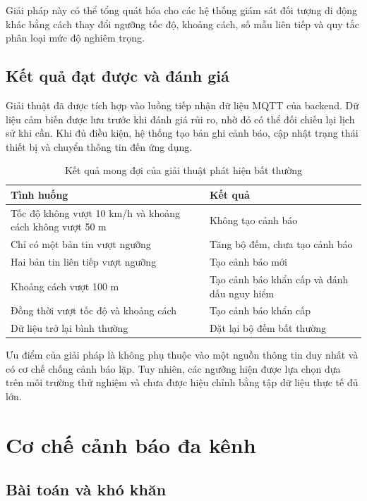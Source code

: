 \documentclass[../DoAn.tex]{subfiles}
\begin{document}
Giải pháp này có thể tổng quát hóa cho các hệ thống giám sát đối tượng di động
khác bằng cách thay đổi ngưỡng tốc độ, khoảng cách, số mẫu liên tiếp và quy tắc
phân loại mức độ nghiêm trọng.

\subsection{Kết quả đạt được và đánh giá}

Giải thuật đã được tích hợp vào luồng tiếp nhận dữ liệu MQTT của backend. Dữ
liệu cảm biến được lưu trước khi đánh giá rủi ro, nhờ đó có thể đối chiếu lại
lịch sử khi cần. Khi đủ điều kiện, hệ thống tạo bản ghi cảnh báo, cập nhật trạng
thái thiết bị và chuyển thông tin đến ứng dụng.

\begin{table}[ht]
\centering
\label{tab:ket-qua-phat-hien}
\begin{tabular}{|p{}|p{}|}
\hline
\textbf{Tình huống} & \textbf{Kết quả} \\ \hline
Tốc độ không vượt 10 km/h và khoảng cách không vượt 50 m & Không tạo cảnh báo \\ \hline
Chỉ có một bản tin vượt ngưỡng & Tăng bộ đếm, chưa tạo cảnh báo \\ \hline
Hai bản tin liên tiếp vượt ngưỡng & Tạo cảnh báo mới \\ \hline
Khoảng cách vượt 100 m & Tạo cảnh báo khẩn cấp và đánh dấu nguy hiểm \\ \hline
Đồng thời vượt tốc độ và khoảng cách & Tạo cảnh báo khẩn cấp \\ \hline
Dữ liệu trở lại bình thường & Đặt lại bộ đếm bất thường \\ \hline
\end{tabular}
\caption{Kết quả mong đợi của giải thuật phát hiện bất thường}
\end{table}

Ưu điểm của giải pháp là không phụ thuộc vào một nguồn thông tin duy nhất và có
cơ chế chống cảnh báo lặp. Tuy nhiên, các ngưỡng hiện được lựa chọn dựa trên môi
trường thử nghiệm và chưa được hiệu chỉnh bằng tập dữ liệu thực tế đủ lớn.


\section{Cơ chế cảnh báo đa kênh}
\label{sec:canh-bao-da-kenh}

\subsection{Bài toán và khó khăn}
\end{document}
